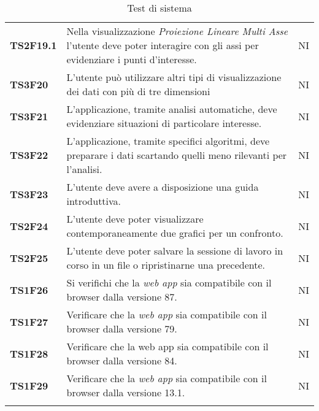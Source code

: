{\begin{longtable}{ C{2cm} | C{12cm}| C{1.5cm} }
\textbf{TS2F19.1} & 
Nella visualizzazione \textit{Proiezione Lineare Multi Asse} l'utente deve poter interagire con gli assi per evidenziare i punti d'interesse. & 
NI\\

\textbf{TS3F20} & 
L'utente può utilizzare altri tipi di visualizzazione dei dati con più di tre dimensioni & 
NI\\

\textbf{TS3F21} & 
L'applicazione, tramite analisi automatiche, deve evidenziare situazioni di particolare interesse. & 
NI\\

\textbf{TS3F22} & 
L'applicazione, tramite specifici algoritmi, deve preparare i dati scartando quelli meno rilevanti per l'analisi. & 
NI\\

\textbf{TS3F23} & 
L'utente deve avere a disposizione una guida introduttiva. & 
NI\\

\textbf{TS2F24} & 
L'utente deve poter visualizzare contemporaneamente due grafici per un confronto. & 
NI\\

\textbf{TS2F25} & 
L'utente deve poter salvare la sessione di lavoro in corso in un file  o ripristinarne una precedente. & 
NI\\

\textbf{TS1F26} & 
Si verifichi che la \textit{web app} sia compatibile con il browser  dalla versione 87. & 
NI\\

\textbf{TS1F27} & 
Verificare che la \textit{web app} sia compatibile con il browser  dalla versione 79. & 
NI\\
		   
\textbf{TS1F28} & 
Verificare che la web app sia compatibile con il browser  dalla versione 84. & 
NI\\

\textbf{TS1F29} & 
Verificare che la \textit{web app} sia compatibile con il browser  dalla versione 13.1. & 
NI\\


\caption{Test di sistema}
\label{testSistema}
\end{longtable}

}
